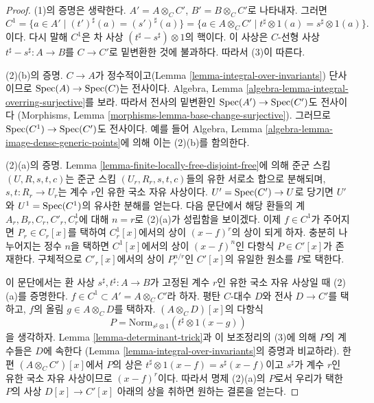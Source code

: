 \begin{proof}
(1)의 증명은 생략한다. $A' = A \otimes_C C'$, $B' = B \otimes_C C'$로 나타내자. 그러면
$$
C^1
= \{a \in A' \mid (t')^\sharp(a) = (s')^\sharp(a) \}
= \{a \in A \otimes_C C' \mid t^\sharp \otimes 1(a) = s^\sharp \otimes 1(a) \}.
$$
이다. 다시 말해 $C^1$은 차 사상 $(t^\sharp - s^\sharp) \otimes 1$의 핵이다. 이 사상은 $C$-선형 사상
$t^\sharp - s^\sharp : A \to B$를 $C \to C'$로 밑변환한 것에 불과하다. 따라서 (3)이 따른다.

\medskip\noindent
(2)(b)의 증명. $C \to A$가 정수적이고(Lemma \ref{lemma-integral-over-invariants}) 단사이므로
$\mathop{\mathrm{Spec}}(A) \to \mathop{\mathrm{Spec}}(C)$는 전사이다. Algebra, Lemma \ref{algebra-lemma-integral-overring-surjective}를 보라.
따라서 전사의 밑변환인 $\mathop{\mathrm{Spec}}(A') \to \mathop{\mathrm{Spec}}(C')$도 전사이다
(Morphisms, Lemma \ref{morphisms-lemma-base-change-surjective}). 그러므로 $\mathop{\mathrm{Spec}}(C^1) \to \mathop{\mathrm{Spec}}(C')$도 전사이다.
예를 들어 Algebra, Lemma \ref{algebra-lemma-image-dense-generic-points}에 의해 이는 (2)(b)를 함의한다.

\medskip\noindent
(2)(a)의 증명. Lemma \ref{lemma-finite-locally-free-disjoint-free}에 의해 준군 스킴 $(U, R, s, t, c)$는
준군 스킴 $(U_r, R_r, s, t, c)$들의 유한 서로소 합으로 분해되며, $s, t : R_r \to U_r$는 계수 $r$인 유한 국소
자유 사상이다. $U' = \mathop{\mathrm{Spec}}(C') \to U$로 당기면 $U'$와 $U^1 = \mathop{\mathrm{Spec}}(C^1)$의 유사한 분해를 얻는다.
다음 문단에서 해당 환들의 계 $A_r, B_r, C_r, C'_r, C^1_r$에 대해 $n = r$로 (2)(a)가 성립함을 보이겠다.
이제 $f \in C^1$가 주어지면 $P_r \in C_r[x]$를 택하여 $C^1_r[x]$에서의 상이 $(x - f)^r$의 상이 되게 하자.
충분히 나누어지는 정수 $n$을 택하면 $C^1[x]$에서의 상이 $(x - f)^n$인 다항식 $P \in C'[x]$가 존재한다.
구체적으로 $C'_r[x]$에서의 상이 $P_r^{n/r}$인 $C'[x]$의 유일한 원소를 $P$로 택한다.

\medskip\noindent
이 문단에서는 환 사상 $s^\sharp, t^\sharp : A \to B$가 고정된 계수 $r$인 유한 국소 자유 사상일 때 (2)(a)를 증명한다.
$f \in C^1 \subset A' = A \otimes_C C'$라 하자. 평탄 $C$-대수 $D$와 전사 $D \to C'$를 택하고,
$f$의 올림 $g \in A \otimes_C D$를 택하자. $(A \otimes_C D)[x]$의 다항식
$$
P = \text{Norm}_{s^\sharp \otimes 1}(t^\sharp \otimes 1(x - g))
$$
을 생각하자. Lemma \ref{lemma-determinant-trick}과 이 보조정리의 (3)에 의해 $P$의 계수들은 $D$에 속한다
(Lemma \ref{lemma-integral-over-invariants}의 증명과 비교하라). 한편 $(A \otimes_C C')[x]$에서 $P$의 상은
$t^\sharp \otimes 1(x - f) = s^\sharp(x - f)$이고 $s^\sharp$가 계수 $r$인 유한 국소 자유 사상이므로 $(x - f)^r$이다.
따라서 명제 (2)(a)의 $P$로서 우리가 택한 $P$의 사상 $D[x] \to C'[x]$ 아래의 상을 취하면 원하는 결론을 얻는다.
\end{proof}

